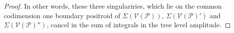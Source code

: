 \documentclass[11pt]{article}
\newcommand{\drawWLD}[2]{

\pgfmathsetmacro{\n}{#1}
\pgfmathsetmacro{\radius}{#2}
\pgfmathsetmacro{\angle}{360/\n}
\draw (0,0) circle (\radius);
    \foreach \i in {1,2,...,\n} {
      \draw (\angle*\i:\radius) node {$\bullet$};
    }

}
\newcommand{\drawprop}[4]{
\pgfmathsetmacro{\r}{#1}
\pgfmathsetmacro{\bumpr}{#2}
\pgfmathsetmacro{\s}{#3}
\pgfmathsetmacro{\bumps}{#4}
\pgfmathsetmacro{\perturbe}{\angle/\n}
\begin{scope}
\draw[smallpropagator] (\angle*\r + \angle/2 + \bumpr*\perturbe:\radius) -- (\angle*\s + \angle/2 + \bumps*\perturbe:\radius);
\end{scope}
}
\newcommand{\modifiedprop}[5]{
\pgfmathsetmacro{\r}{#1}
\pgfmathsetmacro{\bumpr}{#2}
\pgfmathsetmacro{\s}{#3}
\pgfmathsetmacro{\bumps}{#4}
\pgfmathsetmacro{\perturbe}{\angle/\n}

\begin{scope}
\clip (\angle*\r:\radius) -- (\angle + \angle*\r:\radius) -- (\angle*\s:\radius) -- (\angle + \angle*\s:\radius) -- (\angle*\r:\radius);
\draw[#5] (\angle*\r + \angle/2 + \bumpr*\perturbe:\radius) -- (\angle*\s + \angle/2 + \bumps*\perturbe:\radius);
\end{scope}
}
\newcommand{\drawnumbers}{
  \foreach \i in {1,2,...,\n} {
  \pgfmathsetmacro{\x}{\angle*\i}
  \draw (\x:\radius*1.25) node {\footnotesize \i};
}
}
\newcommand{\cP}{\mathcal{P}}
\newcommand{\cV}{\mathcal{V}}
\newcommand{\VP}{\cV(\cP)}
\theoremstyle{remark}
\theoremstyle{definition}
\begin{document}
\begin{proof}
\begin{comment}
        \drawprop{5}{0}{8}{-1}
		\end{scope}
	\end{tikzpicture} \leftrightarrow \begin{tikzpicture}[rotate=67.5,baseline=(current bounding box.east)]
	\begin{scope}
	\drawWLD{10}{1.5}
	\drawnumbers
	\modifiedprop{1}{0}{8}{1}{propagator, dashed}
	\modifiedprop{1}{0}{3}{0}{propagator, dashed}
        \drawprop{5}{0}{8}{-1}
		\end{scope}
	\end{tikzpicture} \leftrightarrow \begin{tikzpicture}[rotate=67.5,baseline=(current bounding box.east)]
	\begin{scope}
	\drawWLD{10}{1.5}
	\drawnumbers
	\modifiedprop{1}{0}{3}{0}{propagator, dashed}
	\modifiedprop{3}{0}{8}{0}{propagator, dashed}
        \drawprop{5}{0}{8}{-1}
		\end{scope}
	\end{tikzpicture}\eas \end{comment}
In other words, these three singulariries, which lie on the common codimension one boundary positroid of $\Sigma(\VP)$, $\Sigma(\VP')$ and $\Sigma(\VP'')$, cancel in the sum of integrals in the tree level amplitude.


\end{proof}
\end{document}
